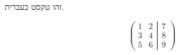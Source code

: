 \documentclass{article}
\begin{document}
זהו טקסט בעברית.

\[
    \left(
    \begin{matrix}
            1 & 2 \\
            3 & 4 \\
            5 & 6
        \end{matrix}
    \left|
    \begin{matrix}
            7 \\
            8 \\
            9
        \end{matrix}
    \right.
    \right)
\]
\end{document}
